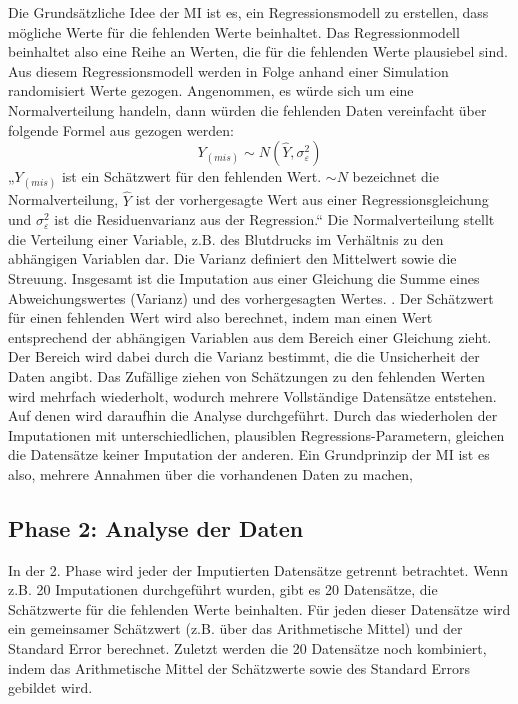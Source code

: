 Die Grundsätzliche Idee der MI ist es, ein Regressionsmodell zu erstellen, dass mögliche Werte für die fehlenden Werte 
beinhaltet. Das Regressionmodell beinhaltet also eine Reihe an Werten, die für die fehlenden Werte plausiebel sind.
Aus diesem Regressionsmodell werden in Folge anhand einer Simulation randomisiert Werte gezogen. Angenommen, es 
würde sich um eine Normalverteilung handeln, dann würden die fehlenden Daten vereinfacht über folgende Formel aus \textcite[8]{Enders2017} gezogen werden:
\begin{equation}
 Y_{(mis)}\sim N(\widehat{Y}, \sigma_\varepsilon^2)
\end{equation}
„$Y_{(mis)}$ ist ein Schätzwert für den fehlenden Wert. $\sim N$ bezeichnet die Normalverteilung, $\widehat{Y}$ ist der vorhergesagte Wert aus 
einer Regressionsgleichung und $\sigma_\varepsilon^2$ ist die Residuenvarianz aus der Regression.“ \autocite[8]{Enders2017}  Die Normalverteilung
stellt die Verteilung einer Variable, z.B. des Blutdrucks im Verhältnis zu den abhängigen Variablen dar. Die Varianz definiert den Mittelwert sowie die Streuung. 
Insgesamt ist die Imputation aus einer Gleichung die Summe eines Abweichungswertes 
(Varianz) und des vorhergesagten Wertes. \autocite[8]{Enders2017}. Der Schätzwert für einen fehlenden Wert wird also berechnet, indem man einen 
Wert entsprechend der abhängigen Variablen aus dem Bereich einer Gleichung zieht. Der Bereich wird dabei durch die Varianz bestimmt, die die Unsicherheit der Daten angibt.
Das Zufällige ziehen von Schätzungen zu den fehlenden Werten wird mehrfach wiederholt, wodurch mehrere Vollständige 
Datensätze entstehen. Auf denen wird daraufhin die Analyse durchgeführt. \autocite[163 ff.]{Lee2014} Durch das 
wiederholen der Imputationen mit unterschiedlichen, plausiblen Regressions-Parametern, gleichen die Datensätze keiner 
Imputation der anderen. \autocite[8]{Enders2017} Ein Grundprinzip der MI ist es also, mehrere Annahmen über die vorhandenen Daten zu machen, 

\subsection{Phase 2: Analyse der Daten}

In der 2. Phase wird jeder der Imputierten Datensätze getrennt betrachtet. Wenn z.B. 20 Imputationen durchgeführt wurden, 
gibt es 20 Datensätze, die Schätzwerte für die fehlenden Werte beinhalten. Für jeden dieser Datensätze wird ein gemeinsamer 
Schätzwert (z.B. über das Arithmetische Mittel) und der Standard Error berechnet. Zuletzt werden die 20 Datensätze noch 
kombiniert, indem das Arithmetische Mittel der Schätzwerte sowie des Standard Errors gebildet wird. \autocite[10]{Enders2017}

